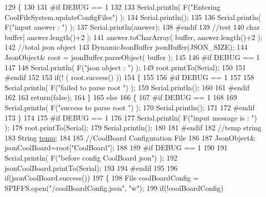 \begin{DoxyCode}
129 \{
130 
131 \textcolor{preprocessor}{#if DEBUG == 1}
132 
133     Serial.println( F(\textcolor{stringliteral}{"Entering CoolFileSystem.updateConfigFiles"}) );
134     Serial.println();
135     
136     Serial.println( F(\textcolor{stringliteral}{"input answer : "}) );
137     Serial.println(answer);
138 \textcolor{preprocessor}{#endif}
139     \textcolor{comment}{//test}
140     \textcolor{keywordtype}{char} buffer[ answer.length()+2 ];
141     answer.toCharArray( buffer, answer.length()+2  );
142     \textcolor{comment}{//total json object }
143     DynamicJsonBuffer jsonBuffer(JSON\_SIZE);
144     JsonObject& root = jsonBuffer.parseObject( buffer );
145 
146 \textcolor{preprocessor}{#if DEBUG == 1}
147 
148     Serial.println( F(\textcolor{stringliteral}{"json object : "}) );  
149     root.printTo(Serial);
150 
151 \textcolor{preprocessor}{#endif}
152 
153     \textcolor{keywordflow}{if}(! ( root.success() ))
154     \{
155     
156 \textcolor{preprocessor}{    #if DEBUG == 1}
157 
158         Serial.println( F(\textcolor{stringliteral}{"failed to parse root "}) );
159         Serial.println();
160     
161 \textcolor{preprocessor}{    #endif}
162 
163         \textcolor{keywordflow}{return}(\textcolor{keyword}{false});
164     \}
165     \textcolor{keywordflow}{else}
166     \{
167 \textcolor{preprocessor}{    #if DEBUG == 1}
168         
169         Serial.println( F(\textcolor{stringliteral}{"success to parse root "}) );
170         Serial.println();
171         
172 \textcolor{preprocessor}{    #endif  }
173     \}
174     
175 \textcolor{preprocessor}{#if DEBUG == 1}
176 
177     Serial.println( F(\textcolor{stringliteral}{"input message is : "}) );
178     root.printTo(Serial);
179     Serial.println();
180 
181 \textcolor{preprocessor}{#endif}
182     \textcolor{comment}{//temp string}
183     String \hyperlink{Irene3000_8h_a5905d48604152cf57aa6bfa087b49173}{temp};
184 
185     \textcolor{comment}{//CoolBoard Configuration File}
186 
187         JsonObject& jsonCoolBoard=root[\textcolor{stringliteral}{"CoolBoard"}];
188 
189 \textcolor{preprocessor}{#if DEBUG == 1}
190 
191     Serial.println( F(\textcolor{stringliteral}{"before config CoolBoard json"}) );
192     jsonCoolBoard.printTo(Serial);
193 
194 \textcolor{preprocessor}{#endif}
195 
196     \textcolor{keywordflow}{if}(jsonCoolBoard.success())
197     \{
198         File coolBoardConfig = SPIFFS.open(\textcolor{stringliteral}{"/coolBoardConfig.json"}, \textcolor{stringliteral}{"w"});   
199         \textcolor{keywordflow}{if}(!coolBoardConfig)

\end{DoxyCode}

